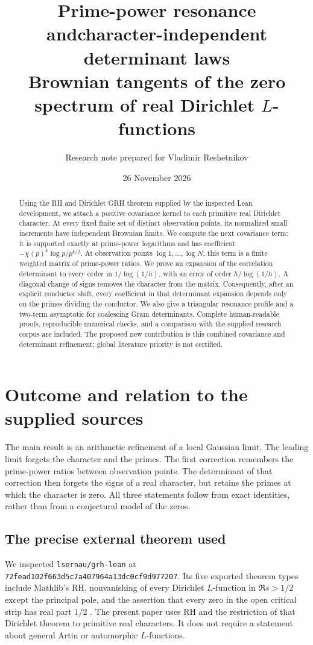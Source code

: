 \documentclass[11pt]{article}
\title{\color{ink}\textbf{Prime-power resonance and\newline character-independent determinant laws}\\[5pt]
\large Brownian tangents of the zero spectrum of real Dirichlet $L$-functions}
\author{Research note prepared for Vladimir Reshetnikov}
\date{26 November 2026}
\theoremstyle{definition}
\begin{document}
\maketitle
\begin{abstract}
Using the RH and Dirichlet GRH theorem supplied by the inspected Lean development,
we attach a positive covariance kernel to each primitive real Dirichlet character.
At every fixed finite set of distinct observation points, its normalized small
increments have independent Brownian limits. We compute the next covariance term:
it is supported exactly at prime-power logarithms and has coefficient
$-\chi(p)^k\log p/p^{k/2}$. At observation points $\log 1,\ldots,\log N$, this term is
a finite weighted matrix of prime-power ratios. We prove an expansion of the
correlation determinant to every order in $1/\log(1/h)$, with an error of order
$h/\log(1/h)$. A diagonal change of signs removes the character from the matrix.
Consequently, after an explicit conductor shift, every coefficient in that
determinant expansion depends only on the primes dividing the conductor.
We also give a triangular resonance profile and a two-term asymptotic for
coalescing Gram determinants. Complete human-readable proofs, reproducible
numerical checks, and a comparison with the supplied research corpus are included.
The proposed new contribution is this combined covariance and determinant refinement;
global literature priority is not certified.
\end{abstract}

\section{Outcome and relation to the supplied sources}

The main result is an arithmetic refinement of a local Gaussian limit. The leading
limit forgets the character and the primes. The first correction remembers the
prime-power ratios between observation points. The determinant of that correction
then forgets the signs of a real character, but retains the primes at which the
character is zero. All three statements follow from exact identities, rather than
from a conjectural model of the zeros.

\subsection{The precise external theorem used}

We inspected \texttt{lsernau/grh-lean} at
\texttt{72fead102f663d5c7a407964a13dc0cf9d977207}. Its five exported theorem types
include Mathlib's RH, nonvanishing of every Dirichlet $L$-function in
$\Re s>1/2$ except the principal pole, and the assertion that every zero in the
open critical strip has real part $1/2$ \cite{grh,statements,main}.
The present paper uses RH and the restriction of that Dirichlet theorem to
primitive real characters. It does not require a statement about general Artin or
automorphic $L$-functions.
\end{document}
